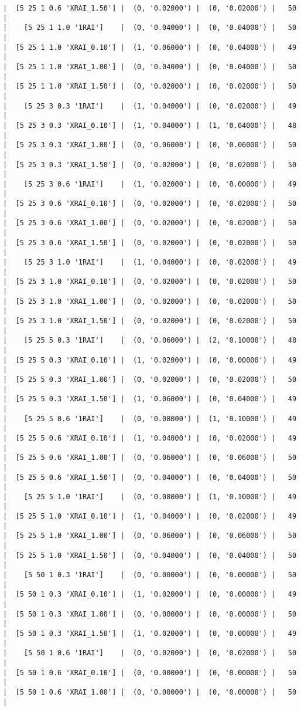 \documentclass{article}
\begin{document}
\begin{verbatim}
|  [5 25 1 0.6 'XRAI_1.50'] |  (0, '0.02000') |  (0, '0.02000') |   50  |
|    [5 25 1 1.0 '1RAI']    |  (0, '0.04000') |  (0, '0.04000') |   50  |
|  [5 25 1 1.0 'XRAI_0.10'] |  (1, '0.06000') |  (0, '0.04000') |   49  |
|  [5 25 1 1.0 'XRAI_1.00'] |  (0, '0.04000') |  (0, '0.04000') |   50  |
|  [5 25 1 1.0 'XRAI_1.50'] |  (0, '0.02000') |  (0, '0.02000') |   50  |
|    [5 25 3 0.3 '1RAI']    |  (1, '0.04000') |  (0, '0.02000') |   49  |
|  [5 25 3 0.3 'XRAI_0.10'] |  (1, '0.04000') |  (1, '0.04000') |   48  |
|  [5 25 3 0.3 'XRAI_1.00'] |  (0, '0.06000') |  (0, '0.06000') |   50  |
|  [5 25 3 0.3 'XRAI_1.50'] |  (0, '0.02000') |  (0, '0.02000') |   50  |
|    [5 25 3 0.6 '1RAI']    |  (1, '0.02000') |  (0, '0.00000') |   49  |
|  [5 25 3 0.6 'XRAI_0.10'] |  (0, '0.02000') |  (0, '0.02000') |   50  |
|  [5 25 3 0.6 'XRAI_1.00'] |  (0, '0.02000') |  (0, '0.02000') |   50  |
|  [5 25 3 0.6 'XRAI_1.50'] |  (0, '0.02000') |  (0, '0.02000') |   50  |
|    [5 25 3 1.0 '1RAI']    |  (1, '0.04000') |  (0, '0.02000') |   49  |
|  [5 25 3 1.0 'XRAI_0.10'] |  (0, '0.02000') |  (0, '0.02000') |   50  |
|  [5 25 3 1.0 'XRAI_1.00'] |  (0, '0.02000') |  (0, '0.02000') |   50  |
|  [5 25 3 1.0 'XRAI_1.50'] |  (0, '0.02000') |  (0, '0.02000') |   50  |
|    [5 25 5 0.3 '1RAI']    |  (0, '0.06000') |  (2, '0.10000') |   48  |
|  [5 25 5 0.3 'XRAI_0.10'] |  (1, '0.02000') |  (0, '0.00000') |   49  |
|  [5 25 5 0.3 'XRAI_1.00'] |  (0, '0.02000') |  (0, '0.02000') |   50  |
|  [5 25 5 0.3 'XRAI_1.50'] |  (1, '0.06000') |  (0, '0.04000') |   49  |
|    [5 25 5 0.6 '1RAI']    |  (0, '0.08000') |  (1, '0.10000') |   49  |
|  [5 25 5 0.6 'XRAI_0.10'] |  (1, '0.04000') |  (0, '0.02000') |   49  |
|  [5 25 5 0.6 'XRAI_1.00'] |  (0, '0.06000') |  (0, '0.06000') |   50  |
|  [5 25 5 0.6 'XRAI_1.50'] |  (0, '0.04000') |  (0, '0.04000') |   50  |
|    [5 25 5 1.0 '1RAI']    |  (0, '0.08000') |  (1, '0.10000') |   49  |
|  [5 25 5 1.0 'XRAI_0.10'] |  (1, '0.04000') |  (0, '0.02000') |   49  |
|  [5 25 5 1.0 'XRAI_1.00'] |  (0, '0.06000') |  (0, '0.06000') |   50  |
|  [5 25 5 1.0 'XRAI_1.50'] |  (0, '0.04000') |  (0, '0.04000') |   50  |
|    [5 50 1 0.3 '1RAI']    |  (0, '0.00000') |  (0, '0.00000') |   50  |
|  [5 50 1 0.3 'XRAI_0.10'] |  (1, '0.02000') |  (0, '0.00000') |   49  |
|  [5 50 1 0.3 'XRAI_1.00'] |  (0, '0.00000') |  (0, '0.00000') |   50  |
|  [5 50 1 0.3 'XRAI_1.50'] |  (1, '0.02000') |  (0, '0.00000') |   49  |
|    [5 50 1 0.6 '1RAI']    |  (0, '0.02000') |  (0, '0.02000') |   50  |
|  [5 50 1 0.6 'XRAI_0.10'] |  (0, '0.00000') |  (0, '0.00000') |   50  |
|  [5 50 1 0.6 'XRAI_1.00'] |  (0, '0.00000') |  (0, '0.00000') |   50  |

\end{verbatim}
\end{document}
